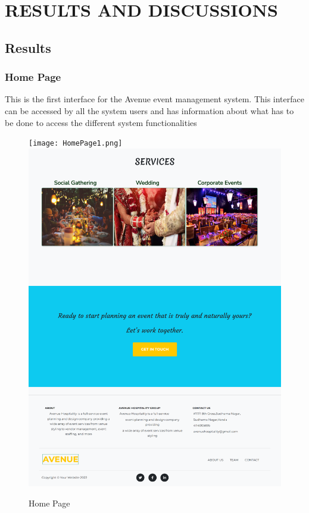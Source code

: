 \chapter{RESULTS AND DISCUSSIONS}
\thispagestyle{empty}
\onehalfspacing
\pagestyle{fancy}
\fancyhf{}
\fancyhead[LE,RO]{\textit{\footnotesize \thepage}}
 
\renewcommand{\headrulewidth}{2pt}
\renewcommand{\footrulewidth}{1pt}
\section{ Results   }
\subsection{Home Page}
This is the first interface for the Avenue event management system. This interface can be
accessed by all the system users and has information about what has to be done to access
the different system functionalities
\begin{figure}[h]
	\centering
	\texttt{[image: HomePage1.png]}
	\includegraphics[scale=0.11]{HomePage2.png}
	\caption{Home Page}
	\label{Home Page}
\end{figure}
